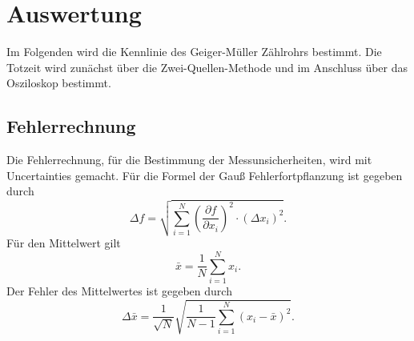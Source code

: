 \section{Auswertung}

\label{sec:auswertung}
Im Folgenden wird die Kennlinie des Geiger-Müller Zählrohrs bestimmt. Die Totzeit wird zunächst über die Zwei-Quellen-Methode
und im Anschluss über das Osziloskop bestimmt.

\subsection{Fehlerrechnung}
\label{sec:Fehlerrechnung}
Die Fehlerrechnung, für die Bestimmung der Messunsicherheiten, wird mit Uncertainties \cite{uncertainties} gemacht.
Für die Formel der Gauß Fehlerfortpflanzung ist gegeben durch
\begin{equation}
    \Delta f=\sqrt{\sum_{i=1}^N\left(\frac{\partial f}{\partial x_i}\right)^2 \cdot\left(\Delta x_i\right)^2}.
    \label{eqn:gauss}
\end{equation}
Für den Mittelwert gilt 
\begin{equation}
    \bar{x} = \frac{1}{N}\sum\limits_{i = 1}^N x_i .
    \label{eqn:mittelwert}
\end{equation}
Der Fehler des Mittelwertes ist gegeben durch 
\begin{equation}
    \Delta \bar{x}=\frac{1}{\sqrt{N}} \sqrt{\frac{1}{N-1} \sum_{i=1}^N\left(x_i-\bar{x}\right)^2}.
    \label{eqn:mittelwertfehler}
\end{equation}
